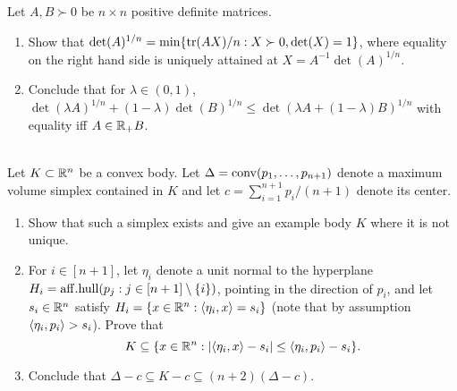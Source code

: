 \begin{exercise}
Let $A,B \succ 0$ be $n \times n$ positive definite matrices.
\begin{enumerate}
\item Show that $\det(A)^{1/n} = \min \{{{\rm tr}(AX)/n: X \succ 0,
\det(X)=1}\}$, where equality on the right hand side is uniquely attained at 
$X = A^{-1} \det(A)^{1/n}$. 
\item Conclude that for $\lambda \in (0,1)$, 
$\det(\lambda A)^{1/n} + (1-\lambda) \det(B)^{1/n} \leq \det(\lambda A +
(1-\lambda)B)^{1/n}$ with equality iff $A \in \mathbb{R}_+ B$. 
\end{enumerate}
\end{exercise}
\solution{
}

\begin{exercise}~\\
Let $K \subset \mathbb{R}^n$ be a convex body. Let $\Delta = {\rm
conv}(p_1,\dots,p_{n+1})$ denote a maximum volume simplex contained in $K$ and
let $c = \sum_{i=1}^{n+1} p_i/(n+1)$ denote its center.
\begin{enumerate}
\item Show that such a simplex exists and give an example body $K$ where it is
not unique.
\item For $i \in [n+1]$, let $\eta_i$ denote a unit normal to the hyperplane
$H_i = {\rm aff.hull}(p_j: j \in [n+1] \setminus \{{i}\})$, pointing in the
direction of $p_i$, and let $s_i \in \mathbb{R}^n$ satisfy $H_i = \{x \in \mathbb{R}^n:
\langle{\eta_i, x}\rangle = s_i\}$ (note that by assumption $\langle{\eta_i, p_i}\rangle > s_i$).
Prove that
\[
K \subseteq \{{x \in \mathbb{R}^n: |\langle{\eta_i, x}\rangle-s_i| \leq \langle{\eta_i, p_i}\rangle-s_i}\}.
\]
\item Conclude that $\Delta-c \subseteq K-c \subseteq (n+2)(\Delta-c)$.
\end{enumerate}
\end{exercise}
\solution{
}


